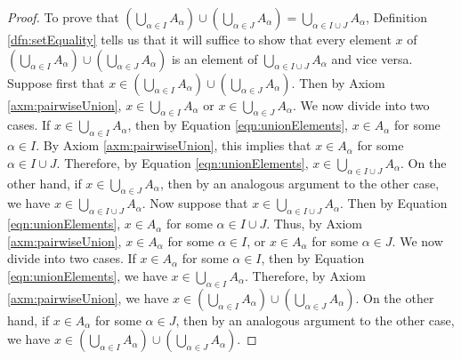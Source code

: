 \documentclass[../main.tex]{subfiles}
\begin{document}
\begin{enumerate}[ref={\thesection.\arabic*}]
\begin{proof}
        To prove that $(\bigcup_{\alpha\in I}A_\alpha)\cup(\bigcup_{\alpha\in J}A_\alpha)=\bigcup_{\alpha\in I\cup J}A_\alpha$, Definition \ref{dfn:setEquality} tells us that it will suffice to show that every element $x$ of $(\bigcup_{\alpha\in I}A_\alpha)\cup(\bigcup_{\alpha\in J}A_\alpha)$ is an element of $\bigcup_{\alpha\in I\cup J}A_\alpha$ and vice versa. Suppose first that $x\in(\bigcup_{\alpha\in I}A_\alpha)\cup(\bigcup_{\alpha\in J}A_\alpha)$. Then by Axiom \ref{axm:pairwiseUnion}, $x\in\bigcup_{\alpha\in I}A_\alpha$ or $x\in\bigcup_{\alpha\in J}A_\alpha$. We now divide into two cases. If $x\in\bigcup_{\alpha\in I}A_\alpha$, then by Equation \ref{eqn:unionElements}, $x\in A_\alpha$ for some $\alpha\in I$. By Axiom \ref{axm:pairwiseUnion}, this implies that $x\in A_\alpha$ for some $\alpha\in I\cup J$. Therefore, by Equation \ref{eqn:unionElements}, $x\in\bigcup_{\alpha\in I\cup J}A_\alpha$. On the other hand, if $x\in\bigcup_{\alpha\in J}A_\alpha$, then by an analogous argument to the other case, we have $x\in\bigcup_{\alpha\in I\cup J}A_\alpha$. Now suppose that $x\in\bigcup_{\alpha\in I\cup J}A_\alpha$. Then by Equation \ref{eqn:unionElements}, $x\in A_\alpha$ for some $\alpha\in I\cup J$. Thus, by Axiom \ref{axm:pairwiseUnion}, $x\in A_\alpha$ for some $\alpha\in I$, or $x\in A_\alpha$ for some $\alpha\in J$. We now divide into two cases. If $x\in A_\alpha$ for some $\alpha\in I$, then by Equation \ref{eqn:unionElements}, we have $x\in\bigcup_{\alpha\in I}A_\alpha$. Therefore, by Axiom \ref{axm:pairwiseUnion}, we have $x\in(\bigcup_{\alpha\in I}A_\alpha)\cup(\bigcup_{\alpha\in J}A_\alpha)$. On the other hand, if $x\in A_\alpha$ for some $\alpha\in J$, then by an analogous argument to the other case, we have $x\in(\bigcup_{\alpha\in I}A_\alpha)\cup(\bigcup_{\alpha\in J}A_\alpha)$.\par

\end{proof}
\end{enumerate}
\end{document}

